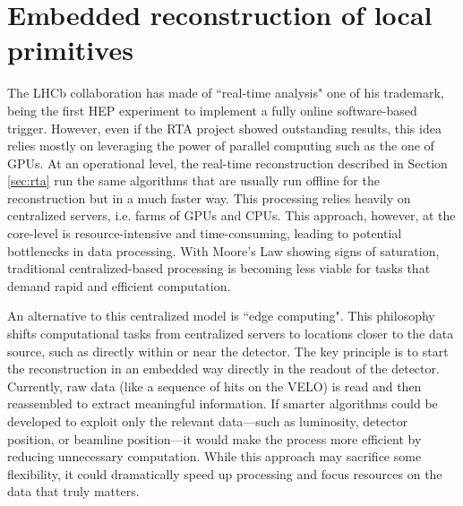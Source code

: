 
\chapter{Embedded reconstruction of local primitives}
\label{chp:retina}

The LHCb collaboration has made of ``real-time analysis" one of his trademark, being the first HEP experiment to implement a fully online software-based trigger. However, even if the RTA project showed outstanding results, this idea relies mostly on leveraging the power of parallel computing such as the one of GPUs. 
At an operational level, the real-time reconstruction described in Section \ref{sec:rta} run the same algorithms that are usually run offline for the reconstruction but in a much faster way. This processing relies heavily on centralized servers, i.e. farms of GPUs and CPUs. This approach, however, at the core-level is resource-intensive and time-consuming, leading to potential bottlenecks in data processing. With Moore's Law showing signs of saturation, traditional centralized-based processing is becoming less viable for tasks that demand rapid and efficient computation.

An alternative to this centralized model is ``edge computing". This philosophy shifts computational tasks from centralized servers to locations closer to the data source, such as directly within or near the detector. The key principle is to start the reconstruction in an embedded way directly in the readout of the detector. Currently, raw data (like a sequence of hits on the VELO) is read and then reassembled to extract meaningful information\cite{https://doi.org/10.5281/zenodo.8119731}. If smarter algorithms could be developed to exploit only the relevant data—such as luminosity, detector position, or beamline position—it would make the process more efficient by reducing unnecessary computation. While this approach may sacrifice some flexibility, it could dramatically speed up processing and focus resources on the data that truly matters.

